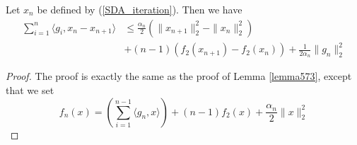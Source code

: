 \begin{lemma}\label{lemma767}
 Let $x_n$ be defined by (\ref{SDA_iteration}). Then we have
 \begin{align}
  \displaystyle\sum_{i = 1}^n \langle g_i, x_n - x_{n+1}\rangle &\leq \frac{\alpha_{n}}{2}(\|x_{n+1}\|_2^2 - \|x_n\|_2^2) \\
  &+ (n-1)(f_2(x_{n+1}) - f_2(x_n)) + \frac{1}{2\alpha_{n}} \|g_n\|_2^2
 \end{align}

\end{lemma}
\begin{proof}
 The proof is exactly the same as the proof of Lemma \ref{lemma573}, except that we set
 \begin{equation}
  f_n(x) = \left(\displaystyle\sum_{i = 1}^{n-1} \langle g_n, x\rangle\right) + (n-1)f_2(x) + \frac{\alpha_{n}}{2}\|x\|_2^2
 \end{equation}

\end{proof}


